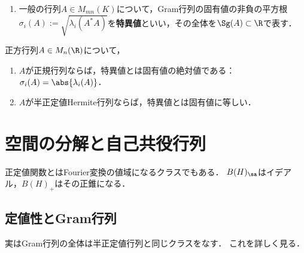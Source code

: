 \documentclass[uplatex, dvipdfmx]{jsreport}
\begin{document}
\begin{definition}\mbox{}
    \begin{enumerate}
        \item 一般の行列$A\in M_{mn}(K)$について，Gram行列の固有値の非負の平方根
        $\sigma_i(A):=\sqrt{\lambda_i(A^*A)}$を\textbf{特異値}といい，その全体を$\Sg(A)\subset\R$で表す．
    \end{enumerate}
\end{definition}

\begin{proposition}[特異値の性質]
    正方行列$A\in M_n(\R)$について，
    \begin{enumerate}
        \item $A$が正規行列ならば，特異値とは固有値の絶対値である：$\sigma_i(A)=\abs{\lambda_i(A)}$．
        \item $A$が半正定値Hermite行列ならば，特異値とは固有値に等しい．
    \end{enumerate}
\end{proposition}

\section{空間の分解と自己共役行列}

\begin{tcolorbox}[colframe=ForestGreen, colback=ForestGreen!10!white,breakable,colbacktitle=ForestGreen!40!white,coltitle=black,fonttitle=\bfseries\sffamily,
title=]
    正定値関数とはFourier変換の値域になるクラスでもある．
    $B(H)_\sa$はイデアル，$B(H)_+$はその正錐になる．
\end{tcolorbox}

\subsection{定値性とGram行列}

\begin{tcolorbox}[colframe=ForestGreen, colback=ForestGreen!10!white,breakable,colbacktitle=ForestGreen!40!white,coltitle=black,fonttitle=\bfseries\sffamily,
title=]
    実はGram行列の全体は半正定値行列と同じクラスをなす．
    これを詳しく見る．
\end{tcolorbox}
\end{document}
